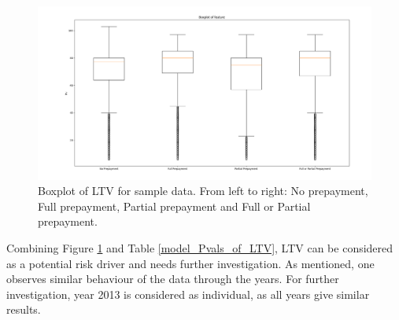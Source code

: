         \begin{figure}[H]
            \centering
            \includegraphics[width=\linewidth]{Latex/Report/Figures/Boxplot_of_ltv_[2013, 2014, 2015, 2016, 2017, 2018, 2019, 2020]_.png}
            \caption{Boxplot of LTV for sample data. From left to right: No prepayment, Full prepayment, Partial prepayment and Full or Partial prepayment.}
            \label{model_boxplot_LTV}
        \end{figure}
    
        \noindent
        Combining Figure \ref{model_boxplot_LTV} and Table \ref{model_Pvals_of_LTV}, LTV can be considered as a potential risk driver and needs further investigation. As mentioned, one observes similar behaviour of the data through the years. For further investigation, year 2013 is considered as individual, as all years give similar results.  
    
